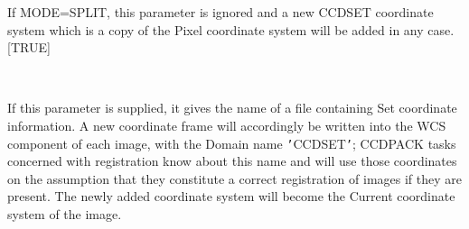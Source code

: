 \documentclass[twoside,11pt]{article}
\renewcommand{\_}{\texttt{\symbol{95}}}
\newcommand{\sstsubsection}[1]{ \item[{#1}] \mbox{} \\}
\newcommand{\sstsubsection}[1]{\item[{#1}]}
\begin{document}
{{{         If MODE=SPLIT, this parameter is ignored and a new CCD\_SET
         coordinate system which is a copy of the Pixel coordinate
         system will be added in any case.
         [TRUE]
      }
      \sstsubsection{
         ASTFILE = LITERAL (Read)
      }{
         If this parameter is supplied, it gives the name of a file
         containing Set coordinate information.  A new coordinate
         frame will accordingly be written into the WCS component
         of each image, with the Domain name {\tt '}CCD\_SET{\tt '}; CCDPACK
         tasks concerned with registration know about this name
         and will use those coordinates on the assumption that they
         constitute a correct registration of images if they are
         present.  The newly added coordinate system will become
         the Current coordinate system of the image.

}}}
\end{document}
